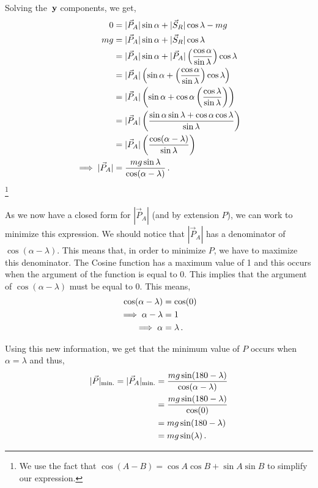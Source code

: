 \begin{subquestions}
\begin{subsubquestions}
	Solving the $\,\mathbf{y}$ components, we get,
	\begin{align}
		0 & = |\vec{P}_{A}|\sin{\alpha} + |\vec{S}_{R}|\cos{\lambda} - mg \nonumber \\
		mg & = |\vec{P}_{A}|\sin{\alpha} + |\vec{S}_{R}|\cos{\lambda} \nonumber \\
		& = |\vec{P}_{A}|\sin{\alpha} + |\vec{P}_{A}|\left(\frac{\cos{\alpha}}{\sin{\lambda}}\right)\cos{\lambda} \nonumber \\
		& = |\vec{P}_{A}|\left(\sin{\alpha} + \left(\frac{\cos{\alpha}}{\sin{\lambda}}\right)\cos{\lambda}\right) \nonumber \\
		& = |\vec{P}_{A}|\left(\sin{\alpha} + \cos{\alpha}\left(\frac{\cos{\lambda}}{\sin{\lambda}}\right)\right) \nonumber \\
		& = |\vec{P}_{A}|\left(\frac{\sin{\alpha}\sin{\lambda}+\cos{\alpha}\cos{\lambda}}{\sin{\lambda}}\right) \nonumber \\
		& = |\vec{P}_{A}|\left(\frac{\cos(\alpha - \lambda)}{\sin{\lambda}}\right) \nonumber \\
		\implies |\vec{P}_{A}| & = \frac{mg \sin{\lambda}}{\cos(\alpha-\lambda)} \,.
	\end{align} \footnote{We use the fact that $\cos(A-B)=\cos{A}\cos{B} + \sin{A}\sin{B}$ to simplify our expression.}
	
	As we now have a closed form for $|\vec{P}_{A}|$ (and by extension $P$), we can work to minimize this expression. We should notice that $|\vec{P}_{A}|$ has a denominator of $\cos(\alpha - \lambda)$. This means that, in order to minimize $P$, we have to maximize this denominator. The Cosine function has a maximum value of 1 and this occurs when the argument of the function is equal to 0. This implies that the argument of $\cos(\alpha - \lambda)$ must be equal to 0. This means,
	\begin{align}
		\cos(\alpha - \lambda) & = \cos(0) \nonumber \\
		\implies \alpha - \lambda & = 1 \nonumber \\
		\implies \alpha & = \lambda \,.
	\end{align}
	
	Using this new information, we get that the minimum value of $P$ occurs when $\alpha=\lambda$ and thus,
	\begin{align}
		|\vec{P}|_{\text{min.}} = |\vec{P}_{A}|_{\text{min.}} & = \frac{mg\sin(180-\lambda)}{\cos(\alpha-\lambda)} \nonumber \\
		& = \frac{mg\sin(180-\lambda)}{\cos(0)} \nonumber \\
		& = mg\sin(180-\lambda) \nonumber \\
		& = mg\sin(\lambda) \,. \label{2014:q55:MinP}
	\end{align}
	

\end{subsubquestions}
\end{subquestions}
